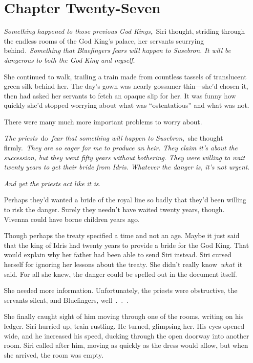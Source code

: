 \section{Chapter Twenty-Seven}

\textit{Something happened to those previous God Kings,}~Siri thought, striding through the endless rooms of the God King’s palace, her servants scurrying behind.~\textit{Something that Bluefingers fears will happen to Susebron. It will be dangerous to both the God King and myself.}

She continued to walk, trailing a train made from countless tassels of translucent green silk behind her. The day’s gown was nearly gossamer thin—she’d chosen it, then had asked her servants to fetch an opaque slip for her. It was funny how quickly she’d stopped worrying about what was “ostentatious” and what was not.

There were many much more important problems to worry about.

\textit{The priests}~do~\textit{fear that something will happen to Susebron,}~she thought firmly.~\textit{They are so eager for me to produce an heir. They claim it’s about the succession, but they went fifty years without bothering. They were willing to wait twenty years to get their bride from Idris. Whatever the danger is, it’s not urgent.}

\textit{And yet the priests act like it is.}

Perhaps they’d wanted a bride of the royal line so badly that they’d been willing to risk the danger. Surely they needn’t have waited twenty years, though. Vivenna could have borne children years ago.

Though perhaps the treaty specified a time and not an age. Maybe it just said that the king of Idris had twenty years to provide a bride for the God King. That would explain why her father had been able to send Siri instead. Siri cursed herself for ignoring her lessons about the treaty. She didn’t really know~\textit{what}~it said. For all she knew, the danger could be spelled out in the document itself.

She needed more information. Unfortunately, the priests were obstructive, the servants silent, and Bluefingers, well~.~.~.

She finally caught sight of him moving through one of the rooms, writing on his ledger. Siri hurried up, train rustling. He turned, glimpsing her. His eyes opened wide, and he increased his speed, ducking through the open doorway into another room. Siri called after him, moving as quickly as the dress would allow, but when she arrived, the room was empty.

